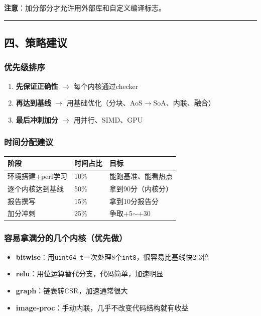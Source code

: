 \documentclass[11pt, a4paper]{article}
\begin{document}
\begin{aibox}
\textbf{注意}：加分部分才允许用外部库和自定义编译标志。

\begin{center}\rule{\textwidth}{0.4pt}\end{center}

\subsection*{四、策略建议}

\subsubsection*{优先级排序}
\begin{enumerate}
    \item \textbf{先保证正确性} $\rightarrow$ 每个内核通过checker
    \item \textbf{再达到基线} $\rightarrow$ 用基础优化（分块、AoS$\rightarrow$SoA、内联、融合）
    \item \textbf{最后冲刺加分} $\rightarrow$ 用并行、SIMD、GPU
\end{enumerate}

\subsubsection*{时间分配建议}
\vspace{0.5em}
\begin{tabularx}{\textwidth}{@{} l l X @{}}
\toprule
阶段 & 时间占比 & 目标 \\
\midrule
环境搭建+perf学习 & 10\% & 能跑基准、能看热点 \\
逐个内核达到基线 & 50\% & 拿到90分（内核分） \\
报告撰写 & 15\% & 拿到10分报告分 \\
加分冲刺 & 25\% & 争取+5$\sim$+30 \\
\bottomrule
\end{tabularx}
\vspace{0.5em}

\subsubsection*{容易拿满分的几个内核（优先做）}
\begin{itemize}
    \item \textbf{bitwise}：用\texttt{uint64\_t}一次处理8个\texttt{int8}，很容易比基线快2-3倍
    \item \textbf{relu}：用位运算替代分支，代码简单，加速明显
    \item \textbf{graph}：链表转CSR，加速通常很大
    \item \textbf{image-proc}：手动内联，几乎不改变代码结构就有收益
\end{itemize}


\end{aibox}
\end{document}
